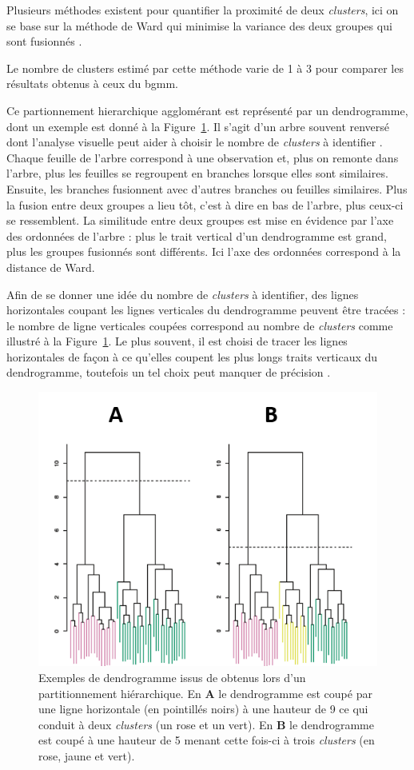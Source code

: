 Plusieurs méthodes existent pour quantifier la proximité de deux \textit{clusters}, ici on se base sur la méthode de Ward qui minimise 
la variance des deux groupes qui sont fusionnés \citep{Ward1963}.

Le nombre de clusters estimé par cette méthode varie de 1 à 3 pour comparer les résultats obtenus à ceux du \gls{bgmm}. 

Ce partionnement hierarchique agglomérant est représenté par un dendrogramme, dont un exemple est donné à la 
Figure~\ref{Figure:tbr_dendrogram_example}. Il s'agit d'un arbre souvent renversé dont l'analyse visuelle 
peut aider à choisir le nombre de \textit{clusters} à identifier \citep{James2013}.
Chaque feuille de l'arbre correspond à une observation et, plus on remonte dans l'arbre, plus les feuilles se regroupent en branches lorsque elles 
sont similaires. Ensuite, les branches fusionnent avec d'autres branches ou feuilles similaires. Plus la fusion entre deux groupes a lieu tôt, c'est à dire en bas de
l'arbre, plus ceux-ci se ressemblent. La similitude entre deux groupes est mise en évidence par l'axe des ordonnées de l'arbre :
plus le trait vertical d'un dendrogramme est grand, plus les groupes fusionnés sont différents. Ici l'axe des ordonnées correspond à la distance de Ward.

Afin de se donner une idée du nombre de \textit{clusters} à identifier, des lignes horizontales coupant les lignes verticales du dendrogramme peuvent être
tracées : le nombre de ligne verticales coupées correspond au nombre de \textit{clusters} comme illustré à la Figure~\ref{Figure:tbr_dendrogram_example}.
Le plus souvent, il est choisi de tracer les lignes horizontales de façon à ce qu'elles coupent les plus longs traits verticaux du dendrogramme, 
toutefois un tel choix peut manquer de précision \citep{James2013}.

\begin{figure}[h!]
  \centering
	\includegraphics[width=0.7\linewidth]{figures/chapter-4/tbr-dendrogram-example} 
  \caption{Exemples de dendrogramme issus de \citet{James2013} obtenus lors d'un partitionnement hiérarchique. En \textbf{A} le dendrogramme est coupé
	par une ligne horizontale (en pointillés noirs) à une hauteur de 9 ce qui conduit à deux \textit{clusters} (un rose et un vert). En \textbf{B} le dendrogramme
	est coupé à une hauteur de 5 menant cette fois-ci à trois \textit{clusters} (en rose, jaune et vert).} 
	\label{Figure:tbr_dendrogram_example} 
\end{figure}

